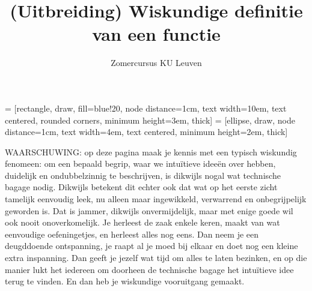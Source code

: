 \documentclass{ximera}
\author{Zomercursus KU Leuven}
\title{(Uitbreiding) Wiskundige definitie van een functie}
\begin{document}
\begin{abstract}

\end{abstract}
\maketitle  

 = [rectangle, draw, fill=blue!20, node distance=1cm, text width=10em, text centered, rounded corners, minimum height=3em, thick]
 = [ellipse, draw, node distance=1cm, text width=4em, text centered, minimum height=2em, thick]


{\scriptsize 
    
    WAARSCHUWING: op deze pagina maak je kennis met een typisch wiskundig fenomeen: om een bepaald begrip, waar we intuïtieve ideeën over hebben,   duidelijk en ondubbelzinnig te beschrijven, is dikwijls nogal wat technische bagage nodig. Dikwijls betekent dit echter ook dat wat op het eerste zicht tamelijk eenvoudig leek, nu alleen maar ingewikkeld, verwarrend en onbegrijpelijk geworden is. Dat is jammer, dikwijls onvermijdelijk, maar met enige goede wil ook nooit onoverkomelijk. Je herleest de zaak enkele keren, maakt van wat eenvoudige oefeningetjes, en herleest alles nog eens. Dan neem je een deugddoende ontspanning, je raapt al je moed bij elkaar en doet nog een kleine extra inspanning. Dan geeft je jezelf wat tijd om alles te laten bezinken, en op die manier lukt het iedereen om doorheen de technische bagage het intuïtieve idee terug te vinden. En dan heb je wiskundige vooruitgang gemaakt.  

}
\end{document}
